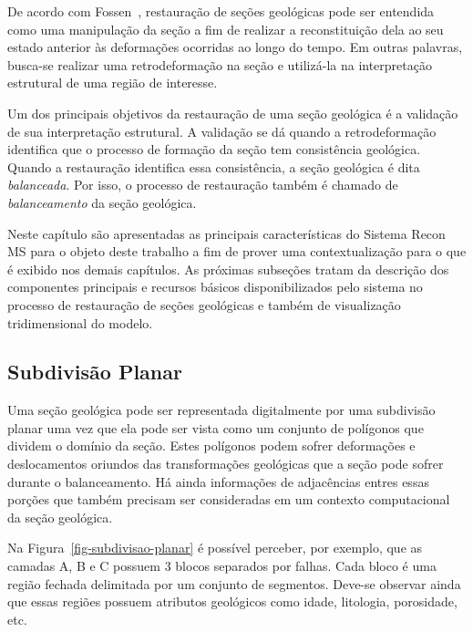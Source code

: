 De acordo com Fossen~\cite{Fossen}, restauração de seções geológicas pode ser entendida como uma manipulação da seção a fim de realizar a reconstituição dela ao seu estado anterior às deformações ocorridas ao longo do tempo. Em outras palavras, busca-se realizar uma retrodeformação na seção e utilizá-la na interpretação estrutural de uma região de interesse.

Um dos principais objetivos da restauração de uma seção geológica é a validação de sua interpretação estrutural. A validação se dá quando a retrodeformação identifica que o processo de formação da seção tem consistência geológica. Quando a restauração identifica essa consistência, a seção geológica é dita \emph{balanceada}. Por isso, o processo de restauração também é chamado de \emph{balanceamento} da seção geológica.

Neste capítulo são apresentadas as principais características do Sistema Recon MS para o objeto deste trabalho a fim de prover uma contextualização para o que é exibido nos demais capítulos. As próximas subseções tratam da descrição dos componentes principais e recursos básicos disponibilizados pelo sistema no processo de restauração de seções geológicas e também de visualização tridimensional do modelo. 

\subsection{Subdivisão Planar} %

Uma seção geológica pode ser representada digitalmente por uma subdivisão planar uma vez que ela pode ser vista como um conjunto de polígonos que dividem o domínio da seção. Estes polígonos podem sofrer deformações e deslocamentos oriundos das transformações geológicas que a seção pode sofrer durante o balanceamento. Há ainda informações de adjacências entres essas porções que também precisam ser consideradas em um contexto computacional da seção geológica.

Na Figura~\ref{fig-subdivisao-planar} é possível perceber, por exemplo, que as camadas A, B e C possuem 3 blocos separados por falhas. Cada bloco é uma região fechada delimitada por um conjunto de segmentos. Deve-se observar ainda que essas regiões possuem atributos geológicos como idade, litologia, porosidade, etc.

